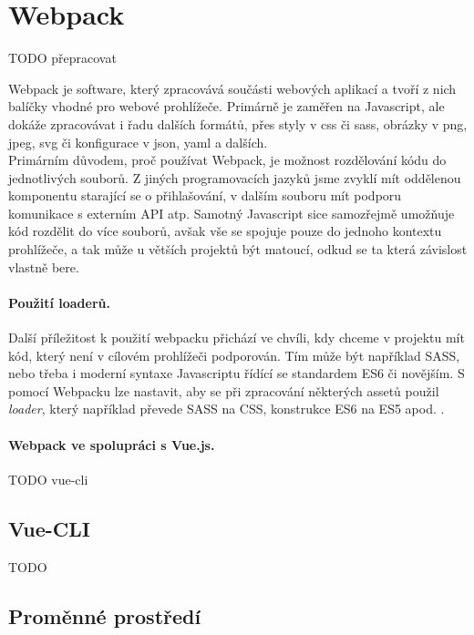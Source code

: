 \section{Webpack}

TODO přepracovat

Webpack \cite{webpack} je software, který zpracovává součásti webových aplikací a tvoří z nich balíčky vhodné pro webové prohlížeče. Primárně je zaměřen na Javascript, ale dokáže zpracovávat i řadu dalších formátů, přes styly v css či sass, obrázky v png, jpeg, svg či konfigurace v json, yaml a dalších.\\
Primárním důvodem, proč používat Webpack, je možnost rozdělování kódu do jednotlivých souborů. Z jiných programovacích jazyků jsme zvyklí mít oddělenou komponentu starající se o přihlašování, v dalším souboru mít podporu komunikace s externím API atp. Samotný Javascript sice samozřejmě umožňuje kód rozdělit do více souborů, avšak vše se spojuje pouze do jednoho kontextu prohlížeče, a tak může u větších projektů být matoucí, odkud se ta která závislost vlastně bere.

\paragraph{Použití loaderů.} Další příležitost k použití webpacku přichází ve chvíli, kdy chceme v projektu mít kód, který není v cílovém prohlížeči podporován. Tím může být například SASS, nebo třeba i moderní syntaxe Javascriptu řídící se standardem ES6 či novějším. S pomocí Webpacku lze nastavit, aby se při zpracování některých assetů použil \emph{loader}, který například převede SASS na CSS, konstrukce ES6 na ES5 apod. \cite{webpack-ackee}.

\paragraph{Webpack ve spolupráci s Vue.js.} TODO vue-cli


\subsection{Vue-CLI}

TODO


\subsection{Proměnné prostředí}

